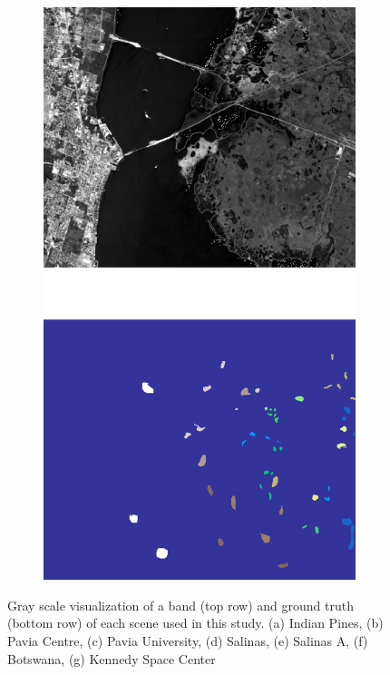 \documentclass[parskip=full]{scrartcl}
\begin{document}
\begin{figure}[H]
\begin{subfigure}{.24\textwidth}
		\includegraphics[height=1.5\linewidth]{../analysis/kennedy_space_center}
		\subcaption{{\medbreak}}\label{fig:kennedy_space_center}
	\end{subfigure}
	\caption{Gray scale visualization of a band (top row) and ground truth (bottom row) of
		each scene used in this study. (a) Indian Pines, (b) Pavia Centre, (c) Pavia
		University, (d) Salinas, (e) Salinas A, (f) Botswana, (g) Kennedy Space Center
    }\label{fig:scenes}
\end{figure}
\end{document}
